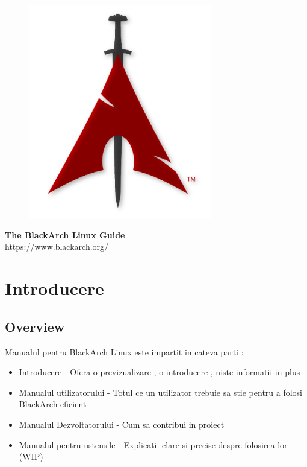 \documentclass[a4paper, oneside, 11pt]{book}
\begin{document}
\pagestyle{empty}
\begin{center}
\begin{figure}[htbp]
\centering
\vspace{0.5cm}
\includegraphics[width=8cm]{images/logo.png}
\label{fig:logo}
\end{figure}
\vspace{0.5cm}
\Huge{\textbf{The BlackArch Linux Guide}}\\
\vspace{1cm}
\Large{\color{red}https://www.blackarch.org/}\\
\vspace{0.5cm}
\end{center}
\newpage
\tableofcontents
\newpage
\pagestyle{fancy}


\chapter{Introducere}

\section{Overview}
Manualul pentru BlackArch Linux este impartit in cateva parti :
\begin{itemize}
\item Introducere - Ofera o previzualizare , o introducere , niste informatii in plus 
\item Manualul utilizatorului - Totul ce un utilizator trebuie sa stie pentru a folosi BlackArch eficient
\item Manualul Dezvoltatorului - Cum sa contribui in proiect
\item Manualul pentru ustensile  - Explicatii clare si precise despre folosirea lor (WIP)
\end{itemize}
\end{document}
